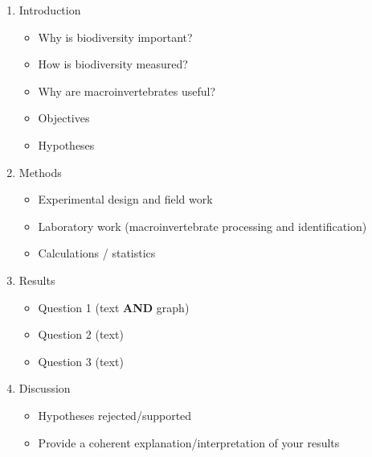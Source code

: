 \documentclass[11pt,]{article}
\providecommand{\tightlist}{%
\setlength{\itemsep}{0pt}\setlength{\parskip}{0pt}}
\begin{document}
\begin{enumerate}
\def\labelenumi{\arabic{enumi}.}
\tightlist
\item
  Introduction

  \begin{itemize}
  \tightlist
  \item
    Why is biodiversity important?
  \item
    How is biodiversity measured?
  \item
    Why are macroinvertebrates useful?
  \item
    Objectives
  \item
    Hypotheses
  \end{itemize}
\item
  Methods

  \begin{itemize}
  \tightlist
  \item
    Experimental design and field work
  \item
    Laboratory work (macroinvertebrate processing and identification)
  \item
    Calculations / statistics
  \end{itemize}
\item
  Results

  \begin{itemize}
  \tightlist
  \item
    Question 1 (text \textbf{AND} graph)
  \item
    Question 2 (text)
  \item
    Question 3 (text)
  \end{itemize}
\item
  Discussion

  \begin{itemize}
  \tightlist
  \item
    Hypotheses rejected/supported
  \item
    Provide a coherent explanation/interpretation of your results
  \end{itemize}
\end{enumerate}




\newpage
\singlespacing 
\end{document}
